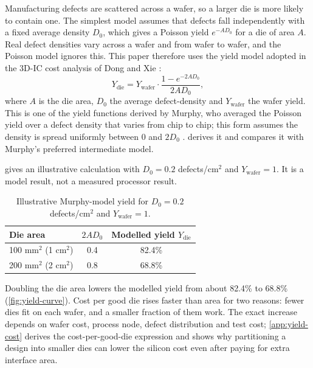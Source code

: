 Manufacturing defects are scattered across a wafer, so a larger die is more likely to contain one. The simplest model assumes that defects fall independently with a fixed average density $D_0$, which gives a Poisson yield $e^{-AD_0}$ for a die of area $A$. Real defect densities vary across a wafer and from wafer to wafer, and the Poisson model ignores this. This paper therefore uses the yield model adopted in the 3D-IC cost analysis of Dong and Xie \cite[Eq.~15]{dongSystemlevelCostAnalysis2009}:
\begin{equation}
  Y_{\mathrm{die}} = Y_{\mathrm{wafer}} \cdot \frac{1 - e^{-2 A D_0}}{2 A D_0},
  \label{eq:yield}
\end{equation}
where $A$ is the die area, $D_0$ the average \gls{defect-density} and $Y_{\mathrm{wafer}}$ the wafer yield. This is one of the yield functions derived by Murphy, who averaged the Poisson yield over a defect density that varies from chip to chip; this form assumes the density is spread uniformly between $0$ and $2D_0$ \cite[Eq.~11]{murphyCostsizeOptimaMonolithic1964}.  derives it and compares it with Murphy's preferred intermediate model.

 gives an illustrative calculation with $D_0 = 0.2$ defects/cm$^2$ and $Y_{\mathrm{wafer}} = 1$. It is a model result, not a measured processor result.

\begin{table}[htbp]
  \centering
  \caption[Illustrative Murphy-model yield]{Illustrative Murphy-model yield for $D_0 = 0.2$ defects/cm$^2$ and $Y_{\mathrm{wafer}} = 1$.}
  \label{tab:yield-example}
  \begin{tabular}{@{}lcc@{}}
    \toprule
    \textbf{Die area} & \textbf{$2 A D_0$} & \textbf{Modelled yield $Y_{\mathrm{die}}$} \\
    \midrule
    100 mm$^2$ (1 cm$^2$) & 0.4 & 82.4\% \\
    200 mm$^2$ (2 cm$^2$) & 0.8 & 68.8\% \\
    \bottomrule
  \end{tabular}
\end{table}

Doubling the die area lowers the modelled yield from about 82.4\% to 68.8\% (\cref{fig:yield-curve}). Cost per good die rises faster than area for two reasons: fewer dies fit on each wafer, and a smaller fraction of them work. The exact increase depends on wafer cost, process node, defect distribution and test cost; \cref{app:yield-cost} derives the cost-per-good-die expression and shows why partitioning a design into smaller dies can lower the silicon cost even after paying for extra interface area.

